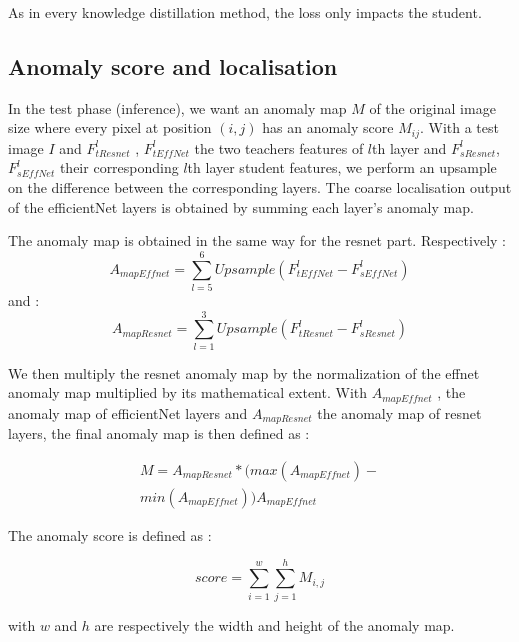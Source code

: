\documentclass[a4paper,twoside]{article}
\begin{document}
As in every knowledge distillation method, the loss only impacts the student.


\subsection{Anomaly score and localisation}

In the test phase (inference), we want  an anomaly map $M$ of the original image size where every pixel at
position $(i,j)$  has an anomaly score $M_{ij}$. With a test
image $I$ and $F_{tResnet}^l$ , $F_{tEffNet}^l$ the two teachers features
of $l$th layer and $F_{sResnet}^l$, $F_{sEffNet}^l$ their corresponding
$l$th layer student features, 
we perform an upsample on the difference between the corresponding layers. The
coarse localisation output of the efficientNet layers is
obtained by summing each layer’s anomaly map.

The anomaly map is obtained in the same way for the resnet part.
Respectively : 
\begin{equation}
A_{mapEffnet}= \sum_{l=5}^{6} Upsample(F_{tEffNet}^l-F_{sEffNet}^l)
\label{eq.8}
\end{equation}
and : 
\begin{equation}
A_{mapResnet}= \sum_{l=1}^{3} Upsample(F_{tResnet}^l-F_{sResnet}^l)
\label{eq.8}
\end{equation}

We then multiply the resnet anomaly map by the normalization of the effnet anomaly map multiplied by its mathematical extent. 
With $A_{mapEffnet}$ , the anomaly
map of efficientNet layers and $A_{mapResnet}$ the anomaly
map of resnet layers, the final anomaly map is then defined
as : 



\begin{equation}
\begin{split}
M=A_{mapResnet}*(max(A_{mapEffnet})- \\ min(A_{mapEffnet}))A_{mapEffnet}
\end{split}
\label{eq.9}
\end{equation}


\noindent The anomaly score is defined as :

\begin{equation}
score=\sum_{i=1}^{w} \sum_{j=1}^{h} M_{i,j}
\label{eq.10}
\end{equation}

\noindent with $w$ and $h$ are respectively the width and height of the anomaly map.
\end{document}

